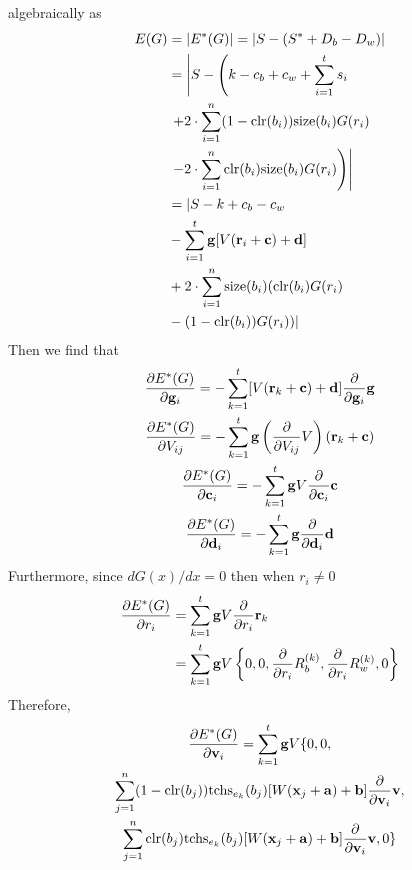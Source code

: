 \documentclass[11pt,letterpaper]{article}
\begin{document}
algebraically as
\begin{align*}
E(G) &= |E^*(G)| = |S - (S^* + D_b - D_w)|\\
  &= \left|S - \left(k - c_b + c_w + \sum_{ i = 1 }^t s_i\right.\right.\\
  &\left.\left.+ 2 \cdot \sum_{ i = 1 }^n (1 - \mbox{clr}{\left( b_i \right)}) \mbox{size}{\left( b_i \right)} G(r_i)\right.\right.\\
  &\left.\left.- 2 \cdot \sum_{ i = 1 }^n \mbox{clr}{\left( b_i \right)} \mbox{size}{\left( b_i \right)} G(r_i)\right)\right|\\
  &= |S - k + c_b - c_w\\
  &- \sum_{ i = 1 }^t \mathbf{ g } [V(\mathbf{ r }_i + \mathbf{ c }) + \mathbf{ d }]\\\
  &+ 2 \cdot \sum_{ i = 1 }^n \mbox{size}{\left( b_i \right)} (\mbox{clr}{\left( b_i \right)}G(r_i)\\
  &- (1 - \mbox{clr}{\left( b_i \right)}) G(r_i))|
\end{align*}
Then we find that
\begin{gather*}
\frac{ \partial E^*(G) }{ \partial \mathbf{ g }_i }
  = -\sum_{ k = 1 }^t [V(\mathbf{ r }_k + \mathbf{ c }) + \mathbf{ d }] \frac{ \partial }{ \partial \mathbf{ g }_i } \mathbf{ g }\\
\frac{ \partial E^*(G) }{ \partial V_{ i j } }
  = -\sum_{ k = 1 }^t \mathbf{ g } \left(\frac{ \partial }{ \partial V_{ i j } } V\right)(\mathbf{ r }_k + \mathbf{ c })\\
\frac{ \partial E^*(G) }{ \partial \mathbf{ c }_i }
  = - \sum_{ k = 1 }^t \mathbf{ g } V \frac{ \partial }{ \partial \mathbf{ c }_i } \mathbf{ c }\\
\frac{ \partial E^*(G) }{ \partial \mathbf{ d }_i } = - \sum_{ k = 1 }^t \mathbf{ g } \frac{ \partial }{ \partial \mathbf{ d }_i } \mathbf{ d }
\end{gather*}
Furthermore, since $d G(x) / d x = 0$ then when $r_i \neq 0$
\begin{align*}
\frac{ \partial E^*(G) }{ \partial r_i }
  &= \sum_{ k = 1 }^t \mathbf{ g } V \frac{ \partial }{ \partial r_i } \mathbf{ r }_k\\
  &= \sum_{ k = 1 }^t \mathbf{ g } V
  \left\{ 0, 0, \frac{ \partial }{ \partial r_i } R_b^{ (k) }, \frac{ \partial }{ \partial r_i } R_w^{ (k) }, 0 \right\}
\end{align*}
Therefore,
\begin{gather*}
\frac{ \partial E^*(G) }{ \partial \mathbf{ v }_i } = \sum_{ k = 1 }^t \mathbf{ g } V \{ 0, 0,\\
  \sum_{ j = 1 }^n (1 - \mbox{clr}{\left( b_j \right)}) \mbox{tchs}_{ e_k }{\left( b_j \right)} [W(\mathbf{ x }_j + \mathbf{ a }) + \mathbf{ b }]
  \frac{ \partial }{ \partial \mathbf{ v }_i } \mathbf{ v },\\
  \sum_{ j = 1 }^n \mbox{clr}{\left( b_j \right)} \mbox{tchs}_{ e_k }{\left( b_j \right)} [W(\mathbf{ x }_j + \mathbf{ a }) + \mathbf{ b }] 
  \frac{ \partial }{ \partial \mathbf{ v }_i } \mathbf{ v }, 0 \}
\end{gather*}
\end{document}
